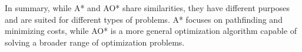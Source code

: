 \documentclass{article}
\begin{document}
\begin{enumerate}
    In summary, while A* and AO* share similarities, they have different purposes and are suited for different types of problems. A* focuses on pathfinding and minimizing costs, while AO* is a more general optimization algorithm capable of solving a broader range of optimization problems.
\end{enumerate}
\end{document}
